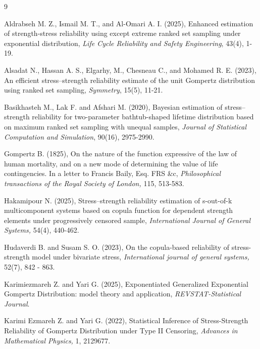 \documentclass[twoside]{article}
\begin{document}
\begin{thebibliography}{9}

Aldrabseh M. Z., Ismail M. T., and Al-Omari A. I. (2025), Enhanced estimation of strength-stress reliability using except extreme ranked set sampling under exponential distribution, {\it Life Cycle Reliability and Safety Engineering}, 43(4), 1-19.

Alsadat N., Hassan A. S., Elgarhy, M., Chesneau C., and Mohamed R. E. (2023), An efficient stress--strength reliability estimate of the unit Gompertz distribution using ranked set sampling, {\it Symmetry}, 15(5), 11-21.

Basikhasteh M., Lak F. and Afshari M. (2020), Bayesian estimation of stress--strength reliability for two-parameter bathtub-shaped lifetime distribution based on maximum ranked set sampling with unequal samples, {\it Journal of Statistical Computation and Simulation}, 90(16), 2975-2990.

Gompertz B. (1825), On the nature of the function expressive of the law of human mortality, and on a new mode of determining the value of life contingencies. In a letter to Francis Baily, Esq. FRS \&c, {\it Philosophical transactions of the Royal Society of London,} 115,  513-583.

Hakamipour N. (2025), Stress--strength reliability estimation of s-out-of-k multicomponent systems based on copula function for dependent strength elements under progressively censored sample, {\it International Journal of General Systems,} 54(4), 440-462.

Hudaverdi B. and Susam S. O. (2023), On the copula-based reliability of stress-strength model under bivariate stress, {\it International journal of general systems,} 52(7),  842 - 863.

Karimiezmareh Z. and Yari G. (2025), Exponentiated Generalized Exponential Gompertz Distribution: model theory and application, {\it REVSTAT-Statistical Journal}.

Karimi Ezmareh Z. and Yari G. (2022), Statistical Inference of Stress-Strength Reliability of Gompertz Distribution under Type II Censoring, {\it Advances in Mathematical Physics,} 1,  2129677.


\end{thebibliography}
\end{document}
